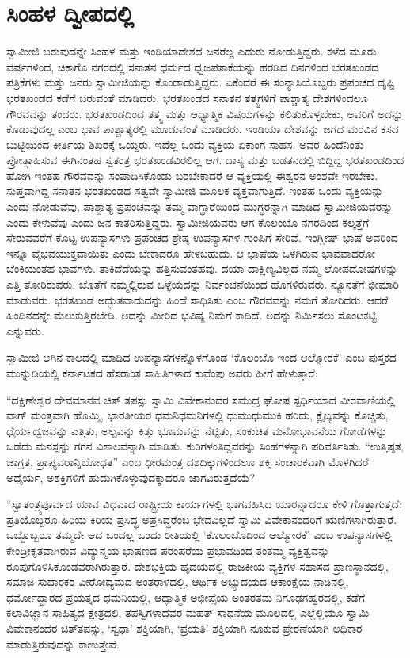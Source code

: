 
\chapter{ಸಿಂಹಳ ದ್ವೀಪದಲ್ಲಿ }

 ಸ್ವಾಮೀಜಿ ಬರುವುದನ್ನೇ ಸಿಂಹಳ ಮತ್ತು ಇಂಡಿಯಾದೇಶದ ಜನರೆಲ್ಲ ಎದುರು ನೋಡುತ್ತಿದ್ದರು. ಕಳೆದ ಮೂರು ವರ್ಷಗಳಿಂದ, ಚಿಕಾಗೊ ನಗರದಲ್ಲಿ ಸನಾತನ ಧರ್ಮದ ಧ್ವಜಪತಾಕೆಯನ್ನು ಹರಡಿದ ದಿನಗಳಿಂದ ಭರತಖಂಡದ ಪತ್ರಿಕೆಗಳು ಮತ್ತು ಜನರು ಸ್ವಾಮೀಜಿಯನ್ನು ಕೊಂಡಾಡುತ್ತಿದ್ದರು. ಏಕೆಂದರೆ ಈ ಸಂನ್ಯಾಸಿಯೊಬ್ಬರು ಪ್ರಪಂಚದ ದೃಷ್ಟಿ ಭರತಖಂಡದ ಕಡೆಗೆ ಬರುವಂತೆ ಮಾಡಿದರು. ಭರತಖಂಡದ ಸನಾತನ ತತ್ತ್ವಗಳಿಗೆ ಪಾಶ್ಚಾತ್ಯ ದೇಶಗಳಿಂದಲೂ ಗೌರವವನ್ನು ತಂದರು. ಭರತಖಂಡದಿಂದ ತತ್ತ್ವ ಮತ್ತು ಆಧ್ಯಾತ್ಮಿಕ ವಿಷಯಗಳನ್ನು ಕಲಿತುಕೊಳ್ಳಬೇಕು, ಅವರಿಗೆ ಅದನ್ನು ಕೊಡುವುದಲ್ಲ ಎಂಬ ಭಾವ ಪಾಶ್ಚಾತ್ಯರಲ್ಲಿ ಮೂಡುವಂತೆ ಮಾಡಿದರು. ಇಂಡಿಯಾ ದೇಶವನ್ನು ಜಗದ ಮರವಿನ ಕಸದ ಬುಟ್ಟಿಯಿಂದ ಕೀರ್ತಿಯ ಶಿಖರಕ್ಕೆ ಒಯ್ದರು. ಇದೆಲ್ಲ ಒಂದು ವ್ಯಕ್ತಿಯ ಏಕಾಂಗ ಸಾಹಸ. ಅವರ ಹಿಂದೆನಿಂತು ಪ್ರೋತ್ಸಾಹಿಸುವ ಈಗಿನಂತಹ ಸ್ವತಂತ್ರ ಭರತಖಂಡವಿರಲಿಲ್ಲ ಆಗ. ದಾಸ್ಯ ಮತ್ತು ಬಡತನದಲ್ಲಿ ಬಿದ್ದಿದ್ದ ಭರತಖಂಡದಿಂದ ಹೋಗಿ ಇಂತಹ ಗೌರವವನ್ನು ಸಂಪಾದಿಸಿಕೊಂಡು ಬರಬೇಕಾದರೆ ಆ ವ್ಯಕ್ತಿಯಲ್ಲಿ ಈಶ್ವರನ ಅಂಶವೇ ಇರಬೇಕು. ಸುಪ್ತವಾಗಿದ್ದ ಸನಾತನ ಭರತಖಂಡದ ಸತ್ವವೇ ಸ್ವಾಮೀಜಿ ಮೂಲಕ ವ್ಯಕ್ತವಾಗುತ್ತಿದೆ. ಇಂತಹ ಒಂದು ವ್ಯಕ್ತಿಯನ್ನು ಎಂದು ನೋಡುವೆವು, ಪಾಶ್ಚಾತ್ಯ ಪ್ರಪಂಚವನ್ನು ತಮ್ಮ ವಾಗ್ಧಾರೆಯಿಂದ ಮುಗ್ಧರನ್ನಾಗಿ ಮಾಡಿದ ಸ್ವಾಮೀಜಿಯವರನ್ನು ಎಂದು ಕೇಳುವೆವು ಎಂದು ಜನ ಕಾತರಿಸುತ್ತಿದ್ದರು. ಸ್ವಾಮೀಜಿಯವರು ಆಗ ಕೊಲಂಬೊ ನಗರದಿಂದ ಕಲ್ಕತ್ತೆಗೆ ಸೇರುವವರೆಗೆ ಕೊಟ್ಟ ಉಪನ್ಯಾಸಗಳು ಪ್ರಪಂಚದ ಶ್ರೇಷ್ಠ ಉಪನ್ಯಾಸಗಳ ಗುಂಪಿಗೆ ಸೇರಿವೆ. ಇಂಗ್ಲೀಷ್ ಭಾಷೆ ಅವರಿಂದ ಇನ್ನೂ ವೈಭವಯುಕ್ತವಾಯಿತು ಎಂದು ಬೇಕಾದರೂ ಹೇಳಬಹುದು. ಆ ಭಾಷೆಯ ಒಳಗಿರುವ ಭಾವವಾದರೋ‌ ಬೆಂಕಿಯಂತಹ ಭಾವಗಳು. ತಾಕಿದೆದೆಯನ್ನು ಹತ್ತಿಸುವಂತಹವು. ದಯಾ ದಾಕ್ಷಿಣ್ಯವಿಲ್ಲದೆ ನಮ್ಮ ಲೋಪದೋಷಗಳನ್ನು ಎತ್ತಿ ತೋರಿರುವರು. ಜೊತೆಗೆ ನಮ್ಮಲ್ಲಿರುವ ಒಳ್ಳೆಯದನ್ನು ನಿರ್ವಂಚನೆಯಿಂದ ಹೊಗಳಿರುವರು. ನ್ಯೂನತೆಗೆ ಛೀಮಾರಿ ಮಾಡುವರು. ಭರತಖಂಡ ಅದ್ಭುತವಾದುದನ್ನು ಹಿಂದೆ ಸಾಧಿಸಿತು ಎಂಬ ಗೌರವವನ್ನು ನಮಗೆ ತೋರಿದರು. ಆದರೆ ಹಿಂದಿನದನ್ನೇ ಮೆಲುಕುತ್ತಿರಬೇಡಿ. ಅದನ್ನು ಮೀರಿದ ಭವಿಷ್ಯ ನಿಮಗೆ ಕಾದಿದೆ. ಅದನ್ನು ನಿರ್ಮಿಸಲು ಸೊಂಟಕಟ್ಟಿ ಎನ್ನುವರು. 

 ಸ್ವಾಮೀಜಿ ಆಗಿನ ಕಾಲದಲ್ಲಿ ಮಾಡಿದ ಉಪನ್ಯಾಸಗಳನ್ನೊಳಗೊಂಡ ‘ಕೊಲಂಬೊ ಇಂದ ಆಲ್ಮೋರಕೆ’ ಎಂಬ ಪುಸ್ತಕದ ಮುನ್ನುಡಿಯಲ್ಲಿ ಕರ್ನಾಟಕದ ಹೆಸರಾಂತ ಸಾಹಿತಿಗಳಾದ ಕುವೆಂಪು ಅವರು ಹೀಗೆ ಹೇಳುತ್ತಾರೆ: 

 “ದಕ್ಷಿಣೇಶ್ವರ ದೇವಮಾನವ ಚಿತ್ ತಪಸ್ಸು ಸ್ವಾಮಿ ವಿವೇಕಾನಂದರ ಸಮುದ್ರ ಘೋಷ ಸ್ಪರ್ಧಿಯಾದ ವೀರವಾಣಿಯಲ್ಲಿ ವಾಗ್ ಮಂತ್ರವಾಗಿ ಹೊಮ್ಮಿ, ಭಾರತೀಯರ ಧಮನಿಧಮನಿಗಳಲ್ಲಿ ಧುಮುಧುಮುಕಿ ಹರಿದು, ಕ್ಲೈಬ್ಯವನ್ನು ಕೊಚ್ಚಿತು, ಧೈರ್ಯಧ್ವಜವನ್ನು ಎತ್ತಿತು, ಅಲ್ಪವನ್ನು ಕಿತ್ತು ಭೂಮವನ್ನು ನೆಟ್ಟಿತು, ಸಂಕುಚಿತ ಮನೋಭಾವನೆಯ ಗೋಡೆಗಳನ್ನು ಒಡೆದು ಮನಸ್ಸನ್ನು ಗಗನ ವಿಶಾಲವನ್ನಾಗಿ ಮಾಡಿತು. ಕುರಿಗಳಂತಿದ್ದವರನ್ನು ಸಿಂಹಗಳನ್ನಾಗಿ ಪರಿವರ್ತಿಸಿತು. “ಉತ್ತಿಷ್ಠತ, ಜಾಗ್ರತ, ಪ್ರಾಪ್ಯವರಾನ್ನಿಬೋಧತ” ಎಂಬ ಧೀರಮಂತ್ರ ದಶದಿಕ್ಕುಗಳಿಂದಲೂ ಶಕ್ತಿ ಸಂಚಾರಕವಾಗಿ ಮೊಳಗಿದರೆ ಅಧೈರ್ಯ, ಅಶಕ್ತಿಗಳಿಗೆ ಹುದುಗಿಕೊಳ್ಳುವುದಕ್ಕಾದರೂ ಜಾಗವಿರುತ್ತದೆಯೆ? 

 “ಸ್ವಾತಂತ್ರ್ಯಪೂರ್ವದ ಯಾವ ವಿಧವಾದ ರಾಷ್ಟ್ರೀಯ ಕಾರ್ಯಗಳಲ್ಲಿ ಭಾಗವಹಿಸಿದ ಯಾರನ್ನಾದರೂ ಕೇಳಿ ಗೊತ್ತಾಗುತ್ತದೆ; ಪ್ರತಿಯೊಬ್ಬರೂ ಹಿರಿಯ ಕಿರಿಯ ಪ್ರಸಿದ್ಧ ಅಪ್ರಸಿದ್ಧರೆಂಬ ಭೇದವಿಲ್ಲದೆ ಸ್ವಾಮಿ ವಿವೇಕಾನಂದರಿಗೆ ಋಣಿಗಳಾಗಿರುತ್ತಾರೆ. ಒಬ್ಬೊಬ್ಬರೂ ತಮ್ಮದೇ ಆದ ಒಂದಲ್ಲ ಒಂದು ರೀತಿಯಲ್ಲಿ ‘ಕೊಲಂಬೊದಿಂದ ಆಲ್ಮೋರಕೆ’ ಎಂಬ ಉಪನ್ಯಾಸಗಳಲ್ಲಿ ಕೇಂದ್ರೀಕೃತವಾಗಿರುವ ವಿದ್ಯುನ್ಮಯ ಭಾಷಣದ ಪರಂಪರೆಯ ಪ್ರಭಾವದಿಂದ ತಂತಮ್ಮ ವ್ಯಕ್ತಿತ್ವವನ್ನು ರೂಪುಗೊಳಿಸಿಕೊಂಡವರಾಗಿರುತ್ತಾರೆ. ದೇಶಭಕ್ತಿಯ ಹೃದಯದಲ್ಲಿ ರಾಜಕೀಯ ವ್ಯಕ್ತಿಗಳ ಸಹಾಸದ ಪ್ರಾಣಸ್ಥಾನದಲ್ಲಿ, ಸಮಾಜ ಸುಧಾರಕರ ವೀರೋದ್ಯಮದ ಅಂತರಾಳದಲ್ಲಿ, ಆರ್ಥಿಕ ಅಭ್ಯುದಯದ ಆಕಾಂಕ್ಷೆಯ ನಾಡಿನಲ್ಲಿ, ಧರ್ಮೋದ್ಧಾರದ ಪ್ರಯತ್ನದ ಧಮನಿಯಲ್ಲಿ, ಆಧ್ಯಾತ್ಮಿಕ ಅಭೀಪ್ಸೆಯ ಅಂತರತಮ ನಿಗೂಢಗಹ್ವರದಲ್ಲಿ, ಕಡೆಗೆ ಕಲಾವಿಜ್ಞಾನ ಸಾಹಿತ್ಯದ ಕ್ಷೇತ್ರದಲಿ, ತಪಸ್ವಿಗಳಾದವರ ಮಹತ್ ಸಾಧನೆಯ ಮೂಲದಲ್ಲಿ ಎಲ್ಲೆಲ್ಲಿಯೂ ಸ್ವಾಮಿ ವಿವೇಕಾನಂದರ ಚಿತ್‍ತಪಸ್ಸು, ‘ಸ್ವಧಾ’ ಶಕ್ತಿಯಾಗಿ, ‘ಪ್ರಯತಿ’ ಶಕ್ತಿಯಾಗಿ ನೂಕುವ ಪ್ರೇರಣೆಯಾಗಿ ಅಧಿಕಾರ ಮಾಡುತ್ತಿರುವುದನ್ನು ಕಾಣುತ್ತೇವೆ. 

